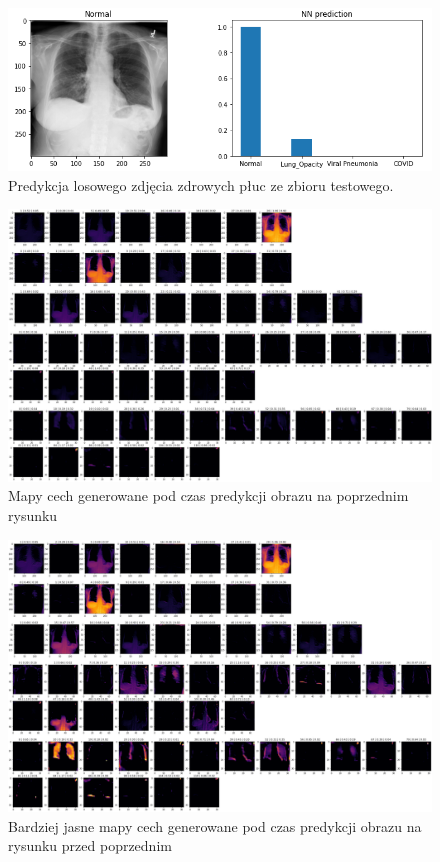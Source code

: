 \documentclass{article}
\begin{document}
\begin{figure}[H]
	\centering
	\includegraphics[width=1\textwidth,keepaspectratio=true]{normal_prediction}
	\caption{Predykcja losowego zdjęcia zdrowych płuc ze zbioru testowego.}
	\label{normal_pediction}
\end{figure}

\begin{figure}[H]
\centering
\includegraphics[width=1\textwidth,keepaspectratio=true]{normal_filters_dark}
\caption{Mapy cech generowane pod czas predykcji obrazu na poprzednim rysunku}
\label{normal_filters_dark}
\end{figure}

\begin{figure}[H]
\centering
\includegraphics[width=1\textwidth,keepaspectratio=true]{normal_filters_light}
\caption{Bardziej jasne mapy cech generowane pod czas predykcji obrazu na rysunku przed poprzednim}
\label{normal_filters_light}
\end{figure}
\end{document}
